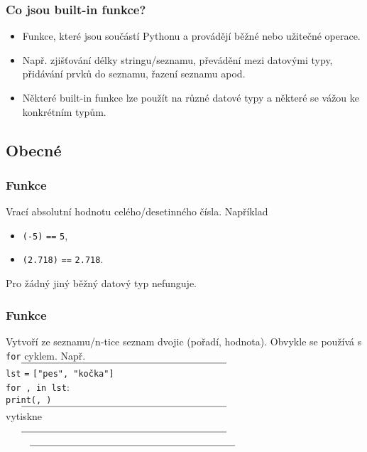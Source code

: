 \begin{frame}
 \frametitle{Co jsou built-in funkce?}
 \begin{itemize}
  \item<1-> Funkce, které jsou součástí Pythonu a provádějí běžné nebo užitečné
   operace.
  \item<2-> Např. zjišťování délky stringu/seznamu, převádění mezi datovými
   typy, přidávání prvků do seznamu, řazení seznamu apod.
  \item<3-> Některé built-in funkce lze použít na různé datové typy a některé se
   vážou ke konkrétním typům.
 \end{itemize}
\end{frame}

\subsection[Obecné]{Obecné}

\begin{frame}
 \frametitle{Funkce \texttt{}}
 \begin{block}{Vrací absolutní hodnotu celého/desetinného čísla.}
  \pause
  Například
  \begin{itemize}
   \item \texttt{(-5)} \texttt{==} \texttt{5},
   \item \texttt{(2.718)} \texttt{==} \texttt{2.718}.
  \end{itemize}
  Pro žádný jiný běžný datový typ nefunguje.
 \end{block}
\end{frame}

\begin{frame}
 \frametitle{Funkce \texttt{}}
 \begin{block}{Vytvoří ze seznamu/n-tice seznam dvojic (pořadí, hodnota).}
  \pause
  Obvykle se používá s \texttt{for} cyklem. Např.
  $\vcenter{\rule{.6\textwidth}{0.4pt}}$
  \texttt{lst} \texttt{=} \texttt{["pes", "kočka"]}\\
  \texttt{for ,  in lst\mlb{)}}:\\
  \hspace{4ex}\texttt{print(, )}
  $\vcenter{\rule{.6\textwidth}{0.4pt}}$
  \pause
  vytiskne 
  $\vcenter{\rule{.6\textwidth}{0.4pt}}$
  \texttt{~}\\
  \texttt{~}
  $\vcenter{\rule{.6\textwidth}{0.4pt}}$
 \end{block}
\end{frame}

